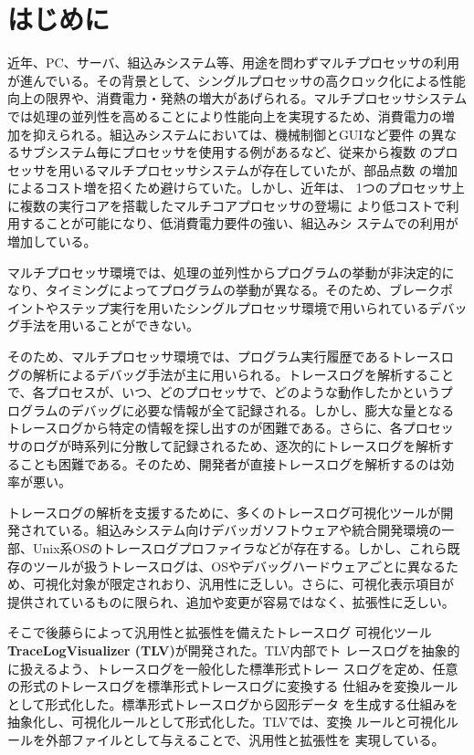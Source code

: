 \chapter{はじめに}

近年、PC、サーバ、組込みシステム等、用途を問わずマルチプロセッサの利用
が進んでいる。その背景として、シングルプロセッサの高クロック化による性能
向上の限界や、消費電力・発熱の増大があげられる。マルチプロセッサシステム
では処理の並列性を高めることにより性能向上を実現するため、消費電力の増
加を抑えられる。組込みシステムにおいては、機械制御とGUIなど要件
の異なるサブシステム毎にプロセッサを使用する例があるなど、従来から複数
のプロセッサを用いるマルチプロセッサシステムが存在していたが、部品点数
の増加によるコスト増を招くため避けらていた。しかし、近年は、
1つのプロセッサ上に複数の実行コアを搭載したマルチコアプロセッサの登場に
より低コストで利用することが可能になり、低消費電力要件の強い、組込みシ
ステムでの利用が増加している。

マルチプロセッサ環境では、処理の並列性からプログラムの挙動が非決定的に
なり、タイミングによってプログラムの挙動が異なる。そのため、ブレークポ
イントやステップ実行を用いたシングルプロセッサ環境で用いられているデバッ
グ手法を用いることができない。

そのため、マルチプロセッサ環境では、プログラム実行履歴であるトレースロ
グの解析によるデバッグ手法が主に用いられる。トレースログを解析すること
で、各プロセスが、いつ、どのプロセッサで、どのような動作したかというプ
ログラムのデバッグに必要な情報が全て記録される。しかし、膨大な量となる
トレースログから特定の情報を探し出すのが困難である。さらに、各プロセッ
サのログが時系列に分散して記録されるため、逐次的にトレースログを解析す
ることも困難である。そのため、開発者が直接トレースログを解析するのは効
率が悪い。

トレースログの解析を支援するために、多くのトレースログ可視化ツールが開
発されている。組込みシステム向けデバッガソフトウェアや統合開発環境の一
部、Unix系OSのトレースログプロファイラなどが存在する。しかし、これら既
存のツールが扱うトレースログは、OSやデバッグハードウェアごとに異なるた
め、可視化対象が限定されおり、汎用性に乏しい。さらに、可視化表示項目が
提供されているものに限られ、追加や変更が容易ではなく、拡張性に乏しい。

そこで後藤ら\cite{goto,ipsj}によって汎用性と拡張性を備えたトレースログ
可視化ツール\textbf{TraceLogVisualizer (TLV)}が開発された。TLV内部でト
レースログを抽象的に扱えるよう、トレースログを一般化した標準形式トレー
スログを定め、任意の形式のトレースログを標準形式トレースログに変換する
仕組みを変換ルールとして形式化した。標準形式トレースログから図形データ
を生成する仕組みを抽象化し、可視化ルールとして形式化した。TLVでは、変換
ルールと可視化ルールを外部ファイルとして与えることで、汎用性と拡張性を
実現している。

